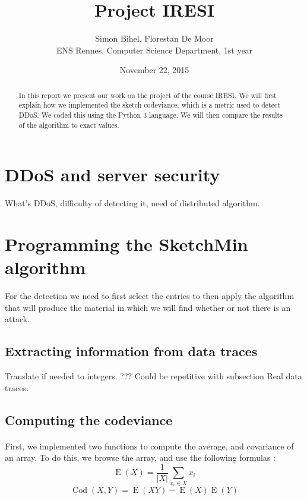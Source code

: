 \documentclass[a4paper]{article}%
\DeclareMathOperator{\E}{E}
\DeclareMathOperator{\Cod}{Cod}
\begin{document}
\title{Project IRESI}

\author{Simon Bihel, Florestan De Moor \\ ENS Rennes, Computer Science Department, 1st year}

\date{November 22, 2015}

\maketitle

\begin{abstract}
	In this report we present our work on the project of the course IRESI. We will first explain how we implemented the sketch codeviance, which is a metric used to detect DDoS. We coded this using the Python 3 language. We will then compare the results of the algorithm to exact values.
\end{abstract}


\section{DDoS and server security}
What's DDoS, difficulty of detecting it, need of distributed algorithm.


\section{Programming the SketchMin algorithm}
For the detection we need to first select the entries to then apply the algorithm that will produce the material in which we will find whether or not there is an attack.

\subsection{Extracting information from data traces}
Translate if needed to integers. ??? Could be repetitive with subsection Real data traces.

\subsection{Computing the codeviance}

\paragraph{}First, we implemented two functions to compute the average, and covariance of an array. To do this, we browse the array, and use the following formulas :
	\[ \E(X) = \frac{1}{|X|} \sum\limits_{x_i \in X} x_i \]
	\[ \Cod(X,Y) = \E(XY) - \E(X)\E(Y) \]
	
\end{document}
